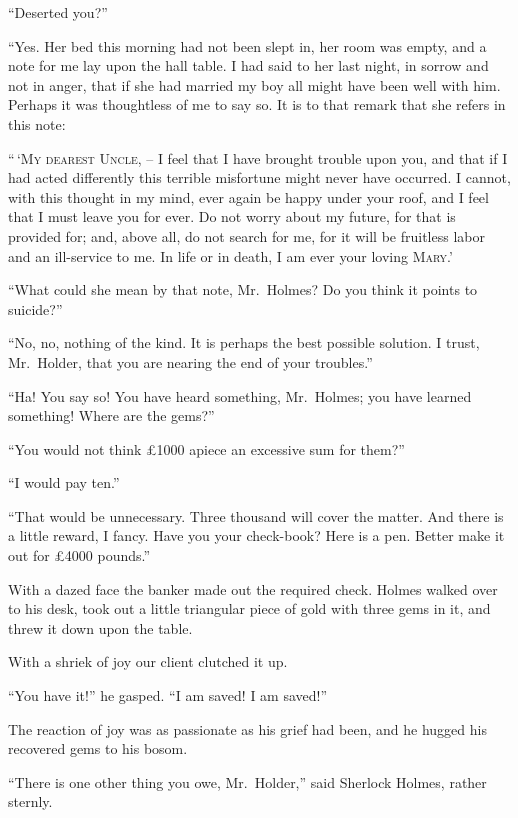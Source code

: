 “Deserted you?”

“Yes. Her bed this morning had not been slept in, her
room was empty, and a note for me lay upon the hall table.
I had said to her last night, in sorrow and not in anger, that
if she had married my boy all might have been well with him.
Perhaps it was thoughtless of me to say so. It is to that remark
that she refers in this note:

\begin{letter}
“\,‘\textsc{My dearest Uncle}, -- I feel that I have brought trouble
upon you, and that if I had acted differently this terrible
misfortune might never have occurred. I cannot, with this thought
in my mind, ever again be happy under your roof, and I feel
that I must leave you for ever. Do not worry about my future,
for that is provided for; and, above all, do not search for
me, for it will be fruitless labor and an ill-service to me. In
life or in death, I am ever your loving \hfill\textsc{Mary}.’
\end{letter}

“What could she mean by that note, Mr.~Holmes? Do
you think it points to suicide?”

“No, no, nothing of the kind. It is perhaps the best possible
solution. I trust, Mr.~Holder, that you are nearing the
end of your troubles.”

“Ha! You say so! You have heard something, Mr.~Holmes;
you have learned something! Where are the gems?”

“You would not think £1000 apiece an excessive sum for
them?”

“I would pay ten.”

“That would be unnecessary. Three thousand will cover
the matter. And there is a little reward, I fancy. Have you
your check-book? Here is a pen. Better make it out for
£4000 pounds.”

With a dazed face the banker made out the required check.
Holmes walked over to his desk, took out a little triangular
piece of gold with three gems in it, and threw it down upon
the table.

With a shriek of joy our client clutched it up.

“You have it!” he gasped. “I am saved! I am saved!”

The reaction of joy was as passionate as his grief had been,
and he hugged his recovered gems to his bosom.

“There is one other thing you owe, Mr.~Holder,” said
Sherlock Holmes, rather sternly.

